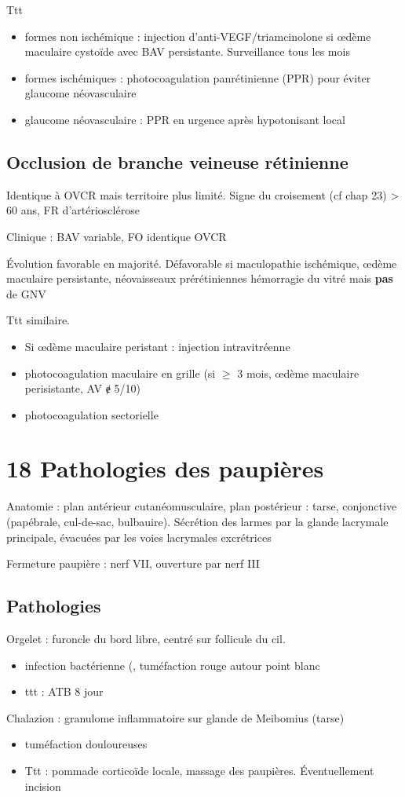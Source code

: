 \documentclass[11pt]{article}
\begin{document}
Ttt 
\begin{itemize}
\item formes non ischémique : injection d'anti-VEGF/triamcinolone si \oe{}dème
maculaire cystoïde avec BAV persistante. Surveillance tous les mois
\item formes ischémiques : photocoagulation panrétinienne (PPR) pour éviter glaucome
néovasculaire
\item glaucome néovasculaire : PPR en urgence après hypotonisant local \danger
\end{itemize}


\subsection{Occlusion de branche veineuse rétinienne}
\label{sec:orgac486db}
Identique à OVCR mais territoire plus limité.
Signe du croisement (cf chap 23) \thus > 60 ans, FR d'artériosclérose

Clinique : BAV variable, FO identique OVCR

Évolution favorable en majorité. Défavorable si maculopathie ischémique,
\oe{}dème maculaire persistante, néovaisseaux prérétiniennes \thus hémorragie du
vitré mais \textbf{pas} de GNV

Ttt similaire. 
\begin{itemize}
\item Si \oe{}dème maculaire peristant : injection intravitréenne
\item photocoagulation maculaire en grille (si \(\ge\) 3 mois, \oe{}dème maculaire
perisistante, AV ɇ 5/10)
\item photocoagulation sectorielle
\end{itemize}
\section{18 Pathologies des paupières}
\label{sec:orgd136632}
Anatomie : plan antérieur cutanéomusculaire, plan postérieur : tarse,
conjonctive (papébrale, cul-de-sac, bulbauire). Sécrétion des larmes par la
glande lacrymale principale, évacuées par les voies lacrymales excrétrices

Fermeture paupière : nerf VII, ouverture par nerf III

\subsection{Pathologies}
\label{sec:org76e01ce}
Orgelet : furoncle du bord libre, centré sur follicule du cil.
\begin{itemize}
\item infection bactérienne (, tuméfaction rouge autour point blanc
\item ttt : ATB 8 jour
\end{itemize}
Chalazion : granulome inflammatoire sur glande de Meibomius (tarse)
\begin{itemize}
\item tuméfaction douloureuses
\item Ttt : pommade corticoïde locale, massage des paupières. Éventuellement
incision
\end{itemize}
\end{document}
